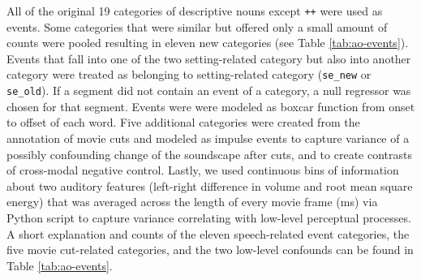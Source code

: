 \documentclass[english]{article}
\begin{document}
All of the original 19 categories of descriptive nouns except \texttt{++} were
used as events. Some categories that were similar but offered only a small
amount of counts were pooled resulting in eleven new categories (see Table
\ref{tab:ao-events}). Events that fall into one of the two setting-related
category but also into another category were treated as belonging to
setting-related category (\texttt{se\_new} or \texttt{se\_old}).
If a segment did not contain an event of a category, a null regressor was chosen for that segment.
Events were were modeled as boxcar function from onset to offset of each word.
Five additional categories were created from the annotation of movie cuts and
modeled as impulse events to capture variance of a possibly confounding change
of the soundscape after cuts, and to create contrasts of cross-modal negative control.
Lastly, we used continuous bins of information about two auditory features
(left-right difference in volume and root mean square energy) that was averaged
across the length of every movie frame (\unit[40]{ms}) via Python script to
capture variance correlating with low-level perceptual processes.
A short explanation and counts of the eleven speech-related event categories,
the five movie cut-related categories, and the two low-level confounds can be
found in Table \ref{tab:ao-events}.
\end{document}
